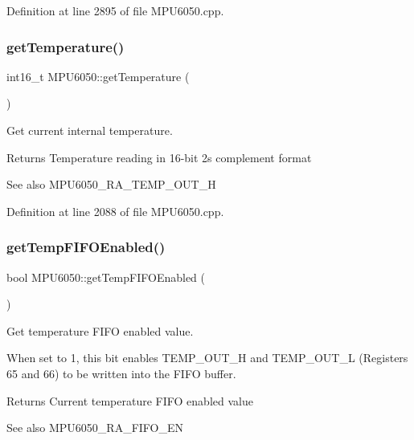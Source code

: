 Definition at line 2895 of file M\+P\+U6050.\+cpp.

\mbox{\label{classMPU6050_aedfa4f1e6507f48c0a09545345a87875}} 
\subsubsection{\texorpdfstring{getTemperature()}{getTemperature()}}
{\footnotesize\ttfamily int16\+\_\+t M\+P\+U6050\+::get\+Temperature (\begin{DoxyParamCaption}{ }\end{DoxyParamCaption})}



Get current internal temperature. 

\begin{DoxyReturn}{Returns}
Temperature reading in 16-\/bit 2\textquotesingle{}s complement format 
\end{DoxyReturn}
\begin{DoxySeeAlso}{See also}
M\+P\+U6050\+\_\+\+R\+A\+\_\+\+T\+E\+M\+P\+\_\+\+O\+U\+T\+\_\+H 
\end{DoxySeeAlso}


Definition at line 2088 of file M\+P\+U6050.\+cpp.

\mbox{\label{classMPU6050_a913c2095001e204b5b09f8382a86d2ca}} 
\subsubsection{\texorpdfstring{getTempFIFOEnabled()}{getTempFIFOEnabled()}}
{\footnotesize\ttfamily bool M\+P\+U6050\+::get\+Temp\+F\+I\+F\+O\+Enabled (\begin{DoxyParamCaption}{ }\end{DoxyParamCaption})}



Get temperature F\+I\+FO enabled value. 

When set to 1, this bit enables T\+E\+M\+P\+\_\+\+O\+U\+T\+\_\+H and T\+E\+M\+P\+\_\+\+O\+U\+T\+\_\+L (Registers 65 and 66) to be written into the F\+I\+FO buffer. \begin{DoxyReturn}{Returns}
Current temperature F\+I\+FO enabled value 
\end{DoxyReturn}
\begin{DoxySeeAlso}{See also}
M\+P\+U6050\+\_\+\+R\+A\+\_\+\+F\+I\+F\+O\+\_\+\+EN 
\end{DoxySeeAlso}


